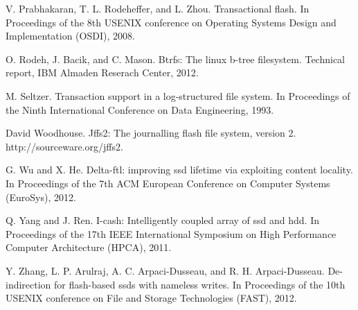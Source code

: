 \begin{translationbib}
\item V. Prabhakaran, T. L. Rodeheffer, and L. Zhou. Transactional flash. In Proceedings of the 8th USENIX conference on Operating Systems Design and Implementation (OSDI), 2008.
\item O. Rodeh, J. Bacik, and C. Mason. Btrfs: The linux b-tree filesystem. Technical report, IBM Almaden Reserach Center, 2012.
\item M. Seltzer. Transaction support in a log-structured file system. In Proceedings of the Ninth International Conference on Data Engineering, 1993.
\item David Woodhouse. Jffs2: The journalling flash file system, version 2. http://sourceware.org/jffs2.
\item G. Wu and X. He. Delta-ftl: improving ssd lifetime via exploiting content locality. In Proceedings of the 7th ACM European Conference on Computer Systems (EuroSys), 2012.
\item Q. Yang and J. Ren. I-cash: Intelligently coupled array of ssd and hdd. In Proceedings of the 17th IEEE International Symposium on High Performance Computer Architecture (HPCA), 2011.
\item Y. Zhang, L. P. Arulraj, A. C. Arpaci-Dusseau, and R. H. Arpaci-Dusseau. De-indirection for flash-based ssds with nameless writes. In Proceedings of the 10th USENIX conference on File and Storage Technologies (FAST), 2012.
\end{translationbib}



